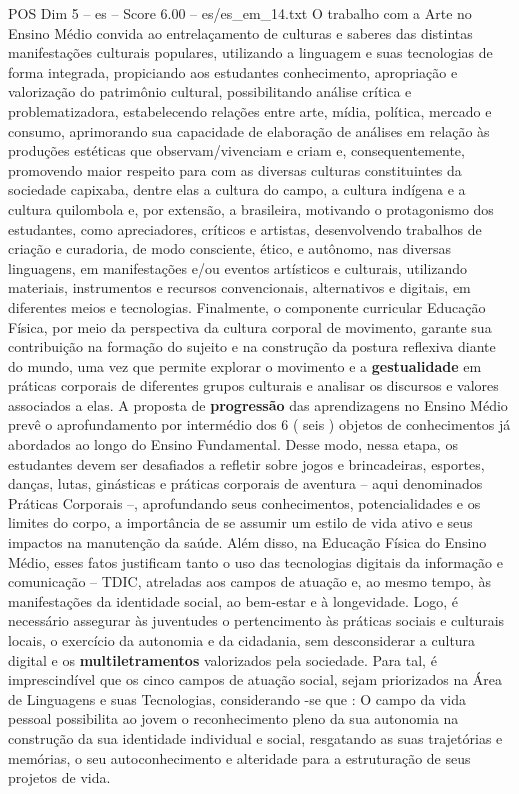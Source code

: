 \begin{textsample}{POS Dim 5 – es – Score 6.00 – es/es\_em\_14.txt}
O trabalho com a Arte no Ensino Médio convida ao entrelaçamento de culturas e saberes das distintas manifestações culturais populares, utilizando a linguagem e suas tecnologias de forma integrada, propiciando aos estudantes conhecimento, apropriação e valorização do patrimônio cultural, possibilitando análise crítica e problematizadora, estabelecendo relações entre arte, mídia, política, mercado e consumo, aprimorando sua capacidade de elaboração de análises em relação às produções estéticas que observam/vivenciam e criam e, consequentemente, promovendo maior respeito para com as diversas culturas constituintes da sociedade capixaba, dentre elas a cultura do campo, a cultura indígena e a cultura quilombola e, por extensão, a brasileira, motivando o protagonismo dos estudantes, como apreciadores, críticos e artistas, desenvolvendo trabalhos de criação e curadoria, de modo consciente, ético, e autônomo, nas diversas linguagens, em manifestações e/ou eventos artísticos e culturais, utilizando materiais, instrumentos e recursos convencionais, alternativos e digitais, em diferentes meios e tecnologias.
Finalmente, o componente curricular Educação Física, por meio da perspectiva da cultura corporal de movimento, garante sua contribuição na formação do sujeito e na construção da postura reflexiva diante do mundo, uma vez que permite explorar o movimento e a \textbf{gestualidade} em práticas corporais de diferentes grupos culturais e analisar os discursos e valores associados a elas.
A proposta de \textbf{progressão} das aprendizagens no Ensino Médio prevê o aprofundamento por intermédio dos 6 ( seis ) objetos de conhecimentos já abordados ao longo do Ensino Fundamental.
Desse modo, nessa etapa, os estudantes devem ser desafiados a refletir sobre jogos e brincadeiras, esportes, danças, lutas, ginásticas e práticas corporais de aventura – aqui denominados Práticas Corporais –, aprofundando seus conhecimentos, potencialidades e os limites do corpo, a importância de se assumir um estilo de vida ativo e seus impactos na manutenção da saúde.
Além disso, na Educação Física do Ensino Médio, esses fatos justificam tanto o uso das tecnologias digitais da informação e comunicação – TDIC, atreladas aos campos de atuação e, ao mesmo tempo, às manifestações da identidade social, ao bem-estar e à longevidade.
Logo, é necessário assegurar às juventudes o pertencimento às práticas sociais e culturais locais, o exercício da autonomia e da cidadania, sem desconsiderar a cultura digital e os \textbf{multiletramentos} valorizados pela sociedade.
Para tal, é imprescindível que os cinco campos de atuação social, sejam priorizados na Área de Linguagens e suas Tecnologias, considerando -se que : O campo da vida pessoal possibilita ao jovem o reconhecimento pleno da sua autonomia na construção da sua identidade individual e social, resgatando as suas trajetórias e memórias, o seu autoconhecimento e alteridade para a estruturação de seus projetos de vida.

\end{textsample}
